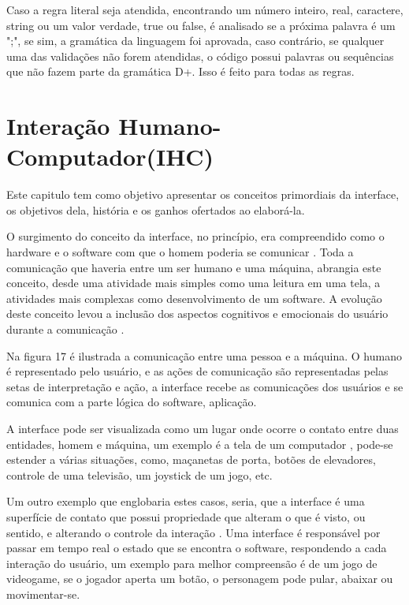 \documentclass[12pt,oneside,a4paper,chapter=TITLE,section=TITLE,sumario=tradicional]{abntex2}
\begin{document}
Caso a regra literal seja atendida, encontrando um número inteiro, real, caractere, string ou um valor verdade, true ou false, é analisado se a próxima palavra é um ";", se sim, a gramática da linguagem foi aprovada, caso contrário, se qualquer uma das validações não forem atendidas, o código possui palavras ou sequências que não fazem parte da gramática D+. Isso é feito para todas as regras. 

\chapter{Interação Humano-Computador(IHC)}
\label{cap:interacao-humano-computador}

Este capitulo tem como objetivo apresentar os conceitos primordiais da interface, os objetivos dela, história e os ganhos ofertados ao elaborá-la. 

O surgimento do conceito da interface, no princípio, era compreendido como o hardware e o software com que o homem poderia se comunicar \cite{rocha2003}.  Toda a comunicação que haveria entre um ser humano e uma máquina, abrangia este conceito, desde uma atividade mais simples como uma leitura em uma tela, a atividades mais complexas como desenvolvimento de um software. A evolução deste conceito levou a inclusão dos aspectos cognitivos e emocionais do usuário durante a comunicação \cite{rocha2003}.

Na figura 17 é ilustrada a comunicação entre uma pessoa e a máquina. O humano é representado pelo usuário, e as ações de comunicação são representadas pelas setas de interpretação e ação, a interface recebe as comunicações dos usuários e se comunica com a parte lógica do software, aplicação.

\begin{figure}[htb]
\end{figure}

A interface pode ser visualizada como um lugar onde ocorre o contato entre duas entidades, homem e máquina, um exemplo é a tela de um computador \cite{rocha2003}, pode-se estender a várias situações, como, maçanetas de porta, botões de elevadores, controle de uma televisão, um joystick de um jogo, etc.

Um outro exemplo que englobaria estes casos, seria, que a interface é uma superfície de contato que possui propriedade que alteram o que é visto, ou sentido, e alterando o controle da interação \cite{laurel1993}. Uma interface é responsável por passar em tempo real o estado que se encontra o software, respondendo a cada interação do usuário, um exemplo para melhor compreensão é de um jogo de videogame, se o jogador aperta um botão, o personagem pode pular, abaixar ou movimentar-se.
\end{document}
